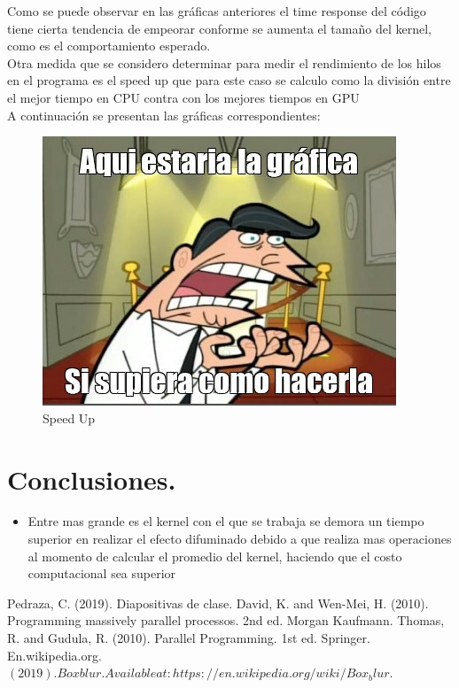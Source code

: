 \documentclass{IEEEtran}
\begin{document}
Como se puede observar en las gráficas anteriores el time response del código tiene cierta tendencia de  empeorar  conforme se aumenta el tamaño del kernel, como es el comportamiento esperado.\\

Otra medida que se considero determinar para medir el rendimiento de los hilos en el programa es el speed up que para este caso se calculo como la división entre el mejor tiempo en CPU contra con los mejores tiempos en GPU \\
A continuación se presentan las gráficas correspondientes:

\begin{figure}[H]
  \includegraphics[width=\linewidth]{memev.jpg}
  \caption{Speed Up}
  \label{fig:boat2}
\end{figure}

\section*{Conclusiones.}
\begin{itemize}
  \item Entre mas grande es el kernel con el que se trabaja se demora un tiempo superior en realizar el efecto difuminado debido a que realiza mas operaciones al momento de calcular el promedio del kernel, haciendo que el costo computacional sea superior
\end{itemize}


\noindent 


\begin{thebibliography}{00}
 Pedraza, C. (2019). Diapositivas de clase.
David, K. and Wen-Mei, H. (2010). Programming massively parallel processos. 2nd ed. Morgan Kaufmann.
 Thomas, R. and Gudula, R. (2010). Parallel Programming. 1st ed. Springer.
 En.wikipedia.org. $(2019). Box blur.  Available at: https://en.wikipedia.org/wiki/Box_blur.$
\end{thebibliography}




\end{document}
